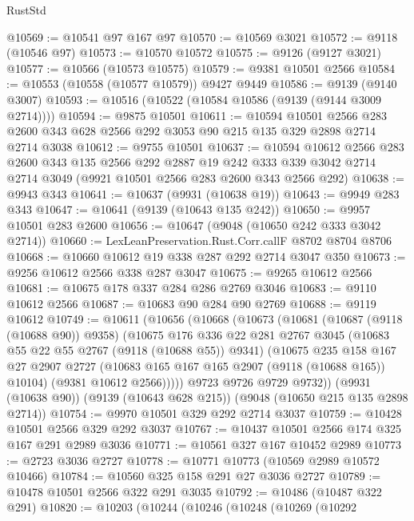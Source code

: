 \begin{lexlean}{RustStd}
\begin{coremodule}
@10569 := @10541 @97 @167 @97
@10570 := @10569 @3021
@10572 := @9118 (@10546 @97)
@10573 := @10570 @10572
@10575 := @9126 (@9127 @3021)
@10577 := @10566 (@10573 @10575)
@10579 := @9381 @10501 @2566
@10584 := @10553 (@10558 (@10577 @10579)) @9427 @9449
@10586 := @9139 (@9140 @3007)
@10593 := @10516 (@10522 (@10584 @10586 (@9139 (@9144 @3009 @2714))))
@10594 := @9875 @10501
@10611 := @10594
    @10501
    @2566
    @283
    @2600
    @343
    @628
    @2566
    @292
    @3053
    @90
    @215
    @135
    @329
    @2898
    @2714
    @2714
    @3038
@10612 := @9755 @10501
@10637 := @10594
    @10612
    @2566
    @283
    @2600
    @343
    @135
    @2566
    @292
    @2887
    @19
    @242
    @333
    @339
    @3042
    @2714
    @2714
    @3049
    (@9921 @10501 @2566 @283 @2600 @343 @2566 @292)
@10638 := @9943 @343
@10641 := @10637 (@9931 (@10638 @19))
@10643 := @9949 @283 @343
@10647 := @10641 (@9139 (@10643 @135 @242))
@10650 := @9957 @10501 @283 @2600
@10656 := @10647 (@9048 (@10650 @242 @333 @3042 @2714))
@10660 := LexLeanPreservation.Rust.Corr.callF @8702 @8704 @8706
@10668 := @10660 @10612 @19 @338 @287 @292 @2714 @3047 @350
@10673 := @9256 @10612 @2566 @338 @287 @3047
@10675 := @9265 @10612 @2566
@10681 := @10675 @178 @337 @284 @286 @2769 @3046
@10683 := @9110 @10612 @2566
@10687 := @10683 @90 @284 @90 @2769
@10688 := @9119 @10612
@10749 := @10611
    (@10656
      (@10668
        (@10673
          (@10681
            (@10687 (@9118 (@10688 @90)) @9358)
            (@10675
              @176
              @336
              @22
              @281
              @2767
              @3045
              (@10683 @55 @22 @55 @2767 (@9118 (@10688 @55)) @9341)
              (@10675
                @235
                @158
                @167
                @27
                @2907
                @2727
                (@10683 @165 @167 @165 @2907 (@9118 (@10688 @165)) @10104)
                (@9381 @10612 @2566)))))
        @9723
        @9726
        @9729
        @9732))
    (@9931 (@10638 @90))
    (@9139 (@10643 @628 @215))
    (@9048 (@10650 @215 @135 @2898 @2714))
@10754 := @9970 @10501 @329 @292 @2714 @3037
@10759 := @10428 @10501 @2566 @329 @292 @3037
@10767 := @10437 @10501 @2566 @174 @325 @167 @291 @2989 @3036
@10771 := @10561 @327 @167 @10452 @2989
@10773 := @2723 @3036 @2727
@10778 := @10771 @10773 (@10569 @2989 @10572 @10466)
@10784 := @10560 @325 @158 @291 @27 @3036 @2727
@10789 := @10478 @10501 @2566 @322 @291 @3035
@10792 := @10486 (@10487 @322 @291)
@10820 := @10203
    (@10244
      (@10246
        (@10248
          (@10269
            (@10292

\end{coremodule}
\end{lexlean}
